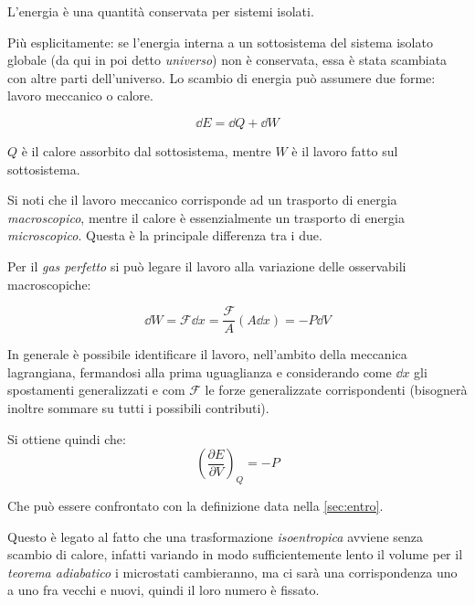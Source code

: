 \begin{defn}
	L'energia è una quantità conservata per sistemi isolati.
	
	Più esplicitamente: se l'energia interna a un sottosistema del sistema isolato globale (da qui in poi detto \textit{universo}) non è conservata, essa è stata scambiata con altre parti dell'universo. Lo scambio di energia può assumere due forme: lavoro meccanico o calore.
	
	\begin{equation*}
		\dd E = \dd Q + \dd W
	\end{equation*}
	
	$Q$ è il calore assorbito dal sottosistema, mentre $W$ è il lavoro fatto sul sottosistema.
\end{defn}

\noindent Si noti che il lavoro meccanico corrisponde ad un trasporto di energia \textit{macroscopico}, mentre il calore è essenzialmente un trasporto di energia \textit{microscopico}. Questa è la principale differenza tra i due.

Per il \textit{gas perfetto} si può legare il lavoro alla variazione delle osservabili macroscopiche\footnotemark:

\begin{equation*}
\dd W = \mathcal{F} \dd x = \frac{\mathcal{F}}{A} (A\dd x) = - P \dd V
\end{equation*}

\noindent In generale è possibile identificare il lavoro, nell'ambito della meccanica lagrangiana, fermandosi alla prima uguaglianza e considerando come $\dd x$ gli spostamenti generalizzati e com $ \mathcal{F} $ le forze generalizzate corrispondenti (bisognerà inoltre sommare su tutti i possibili contributi).
\newline

Si ottiene quindi che:
\begin{equation*}
	\left(\frac{\partial E}{\partial V}\right)_Q = - P
\end{equation*}

\noindent Che può essere confrontato con la definizione data nella \cref{sec:entro}.

\noindent Questo è legato al fatto che una trasformazione \textit{isoentropica} avviene senza scambio di calore, infatti variando in modo sufficientemente lento il volume per il \textit{teorema adiabatico} i microstati cambieranno, ma ci sarà una corrispondenza uno a uno fra vecchi e nuovi, quindi il loro numero è fissato.

